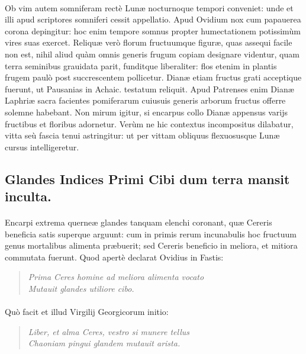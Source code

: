 \documentclass[a4paper, 11pt, oneside, polutonikogreek, latin]{article}
\begin{document}
\paragraph{}
Ob vim autem somniferam rectè Lunæ nocturnoque tempori conveniet: unde et illi apud scriptores somniferi cessit appellatio. Apud Ovidium nox cum papauerea corona depingitur: hoc enim tempore somnus propter humectationem potissimùm vires suas exercet. Reliquæ verò florum fructuumque figuræ, quas assequi facile non est, nihil aliud quàm omnis generis frugum copiam designare videntur, quam terra seminibus grauidata parit, funditque liberaliter: flos etenim in plantis frugem paulò post succrescentem pollicetur. Dianæ etiam fructus grati acceptique fuerunt, ut Pausanias in Achaic. testatum reliquit. Apud Patrenses enim Dianæ Laphriæ sacra facientes pomiferarum cuiusuis generis arborum fructus offerre solemne habebant. Non mirum igitur, si encarpus collo Dianæ appensus varijs fructibus et floribus adornetur. Verùm ne hic contextus incompositus dilabatur, vitta seù fascia tenui astringitur: ut per vittam obliquus flexuosusque Lunæ cursus intelligeretur.
\clearpage
\subsection{Glandes Indices Primi Cibi dum terra mansit inculta.}
\paragraph{}
Encarpi extrema querneæ glandes tanquam elenchi coronant, quæ Cereris beneficia satis superque arguunt: cum in primis rerum incunabulis hoc fructuum genus mortalibus alimenta præbuerit; sed Cereris beneficio in meliora, et mitiora commutata fuerunt. Quod apertè declarat Ovidius in Fastis:
\begin{quote}
\emph{Prima Ceres homine ad meliora alimenta vocato}\\
\hspace*{10mm}\emph{Mutauit glandes utiliore cibo.}\\
\end{quote}
\vspace*{-8mm}
\paragraph{}
Quò facit et illud Virgilij Georgicorum initio:
\begin{quote}
\emph{Liber, et alma Ceres, vestro si munere tellus}\\
\emph{Chaoniam pingui glandem mutauit arista.}\\
\end{quote}
\vspace*{-8mm}
\end{document}
